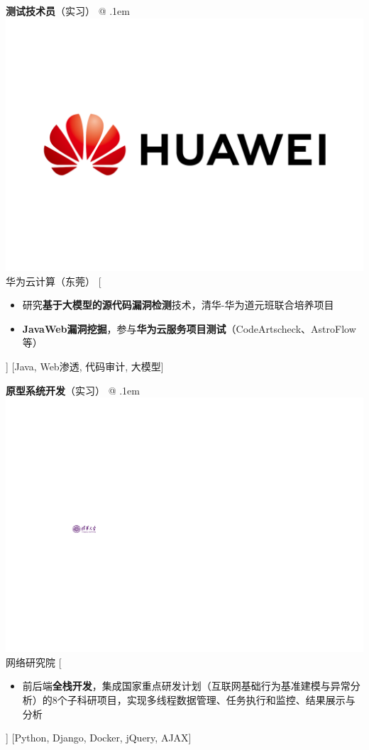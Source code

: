 \documentclass[zh]{resume}
\begin{document}
\vspace{-0.2cm}
\begin{experiences}
    {\textbf{测试技术员}（实习） @ \lower.1em\hbox{\includegraphics[scale=0.07]{photo/HuaweiLogo.pdf}} \textbullet 华为云计算（东莞）}%
    [\begin{itemize}
      \item 研究\textbf{基于大模型的源代码漏洞检测}技术，清华-华为道元班联合培养项目
      \item \textbf{JavaWeb漏洞挖掘}，参与\textbf{华为云服务项目测试}（CodeArtscheck、AstroFlow等）
    \end{itemize}]
    [Java, Web渗透, 代码审计, 大模型]

  \separator{0.5ex}
    {\textbf{原型系统开发}（实习） @ \lower.1em\hbox{\includegraphics[scale=0.6]{photo/Tsinghua.pdf}} \textbullet 网络研究院}%
    [\begin{itemize}
      \item 前后端\textbf{全栈开发}，集成国家重点研发计划（互联网基础行为基准建模与异常分析）的8个子科研项目，实现多线程数据管理、任务执行和监控、结果展示与分析
    \end{itemize}]
    [Python, Django, Docker, jQuery, AJAX]
    

\end{experiences}
\end{document}
